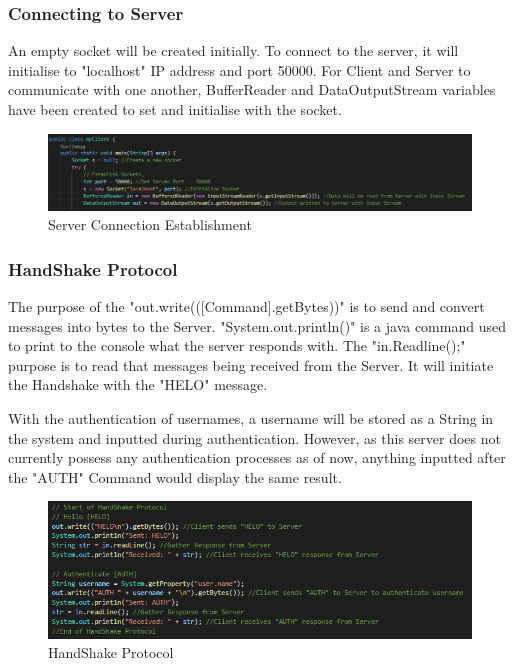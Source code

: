 \documentclass[a4paper]{article} %
\begin{document}
\subsubsection{Connecting to Server}
An empty socket will be created initially. To connect to the server, it will initialise to "localhost" IP address and port 50000. For Client and Server to communicate with one another, BufferReader and DataOutputStream variables have been created to set and initialise with the socket.

\begin{figure}[H]
\begin{center}
\includegraphics[scale=0.6]{Server Connection.png}
\caption{Server Connection Establishment}
\end{center}
\end{figure}

\subsubsection{HandShake Protocol}
The purpose of the "out.write(([Command\n].getBytes))" is to send and convert messages into bytes to the Server. "System.out.println()" is a java command used to print to the console what the server responds with. The "in.Readline();" purpose is to read that messages being received from the Server. It will initiate the Handshake with the "HELO" message.
\bigskip

With the authentication of usernames, a username will be stored as a String in the system and inputted during authentication. However, as this server does not currently possess any authentication processes as of now, anything inputted after the "AUTH" Command would display the same result.

\begin{figure}[H]
\begin{center}
\includegraphics[scale=0.5]{HandShake Protocol.png}
\caption{HandShake Protocol}
\end{center}
\end{figure}
\end{document}
